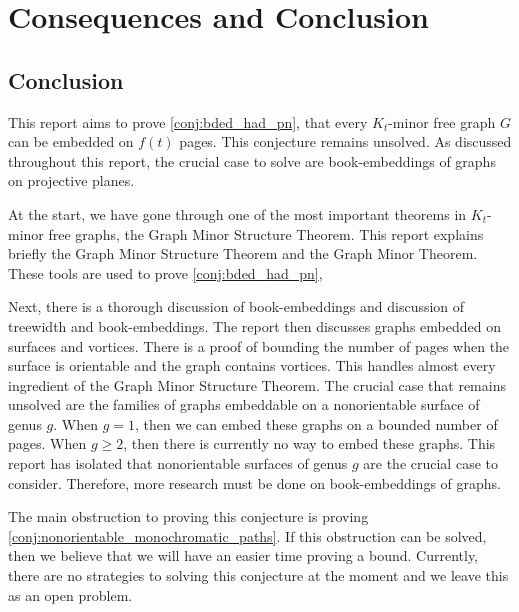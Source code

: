 \chapter{Consequences and Conclusion}\label{chap:conclusion}



\section{Conclusion}
This report aims to prove \cref{conj:bded_had_pn}, that every $K_t$-minor free graph $G$ can be embedded on $f(t)$ pages. This conjecture remains unsolved. 
As discussed throughout this report, the crucial case to solve are book-embeddings of graphs on projective planes. 

At the start, we have gone through one of the most important theorems in $K_t$-minor free graphs, the Graph Minor Structure Theorem. This report explains briefly the Graph Minor Structure Theorem and the Graph Minor Theorem. 
These tools are used to prove \cref{conj:bded_had_pn},

Next, there is a thorough discussion of book-embeddings and discussion of treewidth and book-embeddings. The report then discusses graphs embedded on surfaces and vortices. There is a proof of bounding the number of pages when the surface is orientable and the graph contains vortices. This handles almost every ingredient of the Graph Minor Structure Theorem. The crucial case that remains unsolved are the families of graphs embeddable on a nonorientable surface of genus $g$. When $g = 1$, then we can embed these graphs on a bounded number of pages. When $g \geq 2$, then there is currently no way to embed these graphs. This report has isolated that nonorientable surfaces of genus $g$ are the crucial case to consider. Therefore, more research must be done on book-embeddings of graphs. 

The main obstruction to proving this conjecture is proving \cref{conj:nonorientable_monochromatic_paths}. If this obstruction can be solved, then we believe that we will have an easier time proving a bound. Currently, there are no strategies to solving this conjecture at the moment and we leave this as an open problem. 
